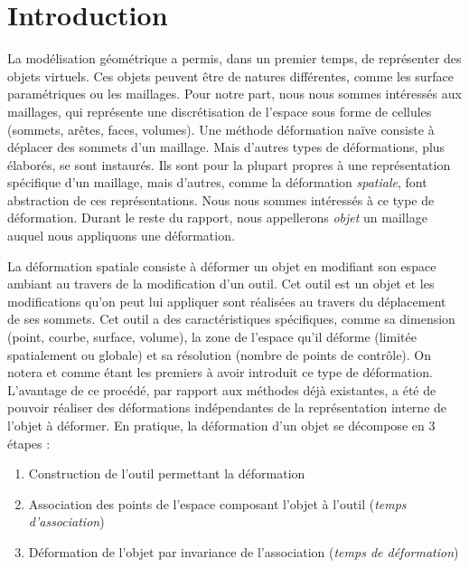 
\chapter{Introduction}

\graphicspath{ {Introduction/IntroductionFigs/PNG/}
  {Introduction/IntroductionFigs/PDF/}
  {Introduction/IntroductionFigs/} }

La modélisation géométrique a permis, dans un premier temps, de représenter des
objets virtuels. Ces objets peuvent être de natures différentes, comme les
surface paramétriques ou les maillages. Pour notre part, nous nous sommes
intéressés aux maillages, qui représente une discrétisation de l'espace sous
forme de cellules (sommets, arêtes, faces, volumes). Une méthode déformation
naïve consiste à déplacer des sommets d'un maillage. Mais d'autres types de
déformations, plus élaborés, se sont instaurés. Ils sont pour la plupart propres
à une représentation spécifique d'un maillage, mais d'autres, comme la
déformation \textit{spatiale}, font abstraction de ces représentations. Nous
nous sommes intéressés à ce type de déformation. Durant le reste du rapport,
nous appellerons \textit{objet} un maillage auquel nous appliquons une
déformation.
	
La déformation spatiale consiste à déformer un objet en modifiant son espace
ambiant au travers de la modification d'un outil. Cet outil est un objet et les
modifications qu'on peut lui appliquer sont réalisées au travers du déplacement
de ses sommets. Cet outil a des caractéristiques spécifiques, comme sa dimension
(point, courbe, surface, volume), la zone de l'espace qu'il déforme (limitée
spatialement ou globale) et sa résolution (nombre de points de contrôle). On notera
\cite{Bar84} et \cite{SP86} comme étant les premiers à avoir introduit ce type
de déformation. L'avantage de ce procédé, par rapport aux méthodes déjà
existantes, a été de pouvoir réaliser des déformations indépendantes de la
représentation interne de l'objet à déformer.
\newpage
En pratique, la déformation d'un objet se décompose en 3 étapes :
\begin{enumerate}  

\item Construction de l'outil permettant la déformation

\item Association des points de l'espace composant l'objet à l'outil
(\textit{temps d'association})

\item Déformation de l'objet par invariance de l'association (\textit{temps de
déformation})

\end{enumerate} 

